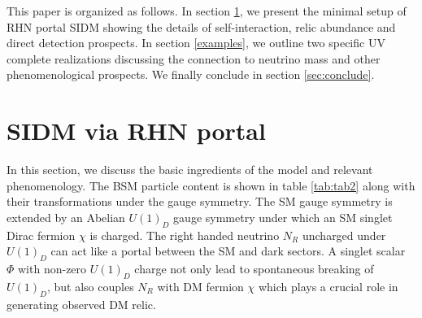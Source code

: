 \documentclass[prd,nofootinbib,preprint,superscriptaddress]{revtex4}
\begin{document}
	
	
	This paper is organized as follows. In section \ref{model}, we present the minimal setup of RHN portal SIDM showing the details of self-interaction, relic abundance and direct detection prospects. In section \ref{examples}, we outline two specific UV complete realizations discussing the connection to neutrino mass and other phenomenological prospects. We finally conclude in section \ref{sec:conclude}.			
	
	\section{SIDM via RHN portal}
	\label{model}
	In this section, we discuss the basic ingredients of the model and relevant phenomenology. The BSM particle content is shown in table \ref{tab:tab2} along with their transformations under the gauge symmetry. The SM gauge symmetry is extended by an Abelian $U(1)_D$ gauge symmetry under which an SM singlet Dirac fermion $\chi$ is charged. The right handed neutrino $N_R$ uncharged under $U(1)_D$ can act like a portal between the SM and dark sectors. A singlet scalar $\Phi$ with non-zero $U(1)_D$ charge not only lead to spontaneous breaking of $U(1)_D$, but also couples $N_R$ with DM fermion $\chi$ which plays a crucial role in generating observed DM relic.
	
\end{document}
